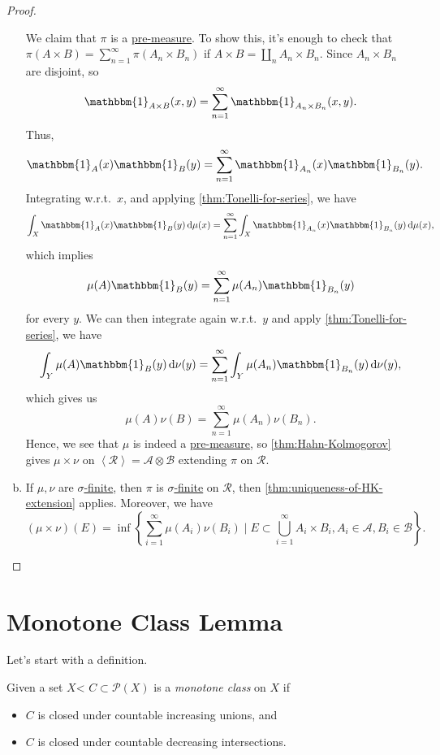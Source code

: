 \begin{proof}
\begin{enumerate}[(a)]
		      We claim that \(\pi \) is a \hyperref[def:pre-measure]{pre-measure}. To show this, it's enough to check that \(\pi (A\times B) = \sum_{n=1}^{\infty} \pi (A_{n} \times B_{n} )\)
		      if \(A\times B = \coprod_{n}A_{n} \times B_{n}  \). Since \(A_{n} \times B_{n} \) are disjoint, so
		      \[
			      \mathbbm{1}_{A\times B}(x, y) = \sum_{n=1}^{\infty} \mathbbm{1}_{A_{n} \times B_{n} }(x, y).
		      \]
		      Thus,
		      \[
			      \mathbbm{1}_{A} (x)\mathbbm{1}_{B} (y) = \sum_{n=1}^{\infty} \mathbbm{1}_{A_{n} }(x)\mathbbm{1}_{B_{n}}(y).
		      \]
		      Integrating w.r.t.\ \(x\), and applying \autoref{thm:Tonelli-for-series}, we have
		      \[
			      \int _X \mathbbm{1}_{A} (x)\mathbbm{1}_{B}(y)\,\mathrm{d} \mu (x) = \sum_{n=1}^{\infty} \int _X \mathbbm{1}_{A_{n} }(x)\mathbbm{1}_{B_{n} }(y)\,\mathrm{d} \mu (x),
		      \]
		      which implies
		      \[
			      \mu (A)\mathbbm{1}_{B} (y) = \sum_{n=1}^{\infty} \mu (A_{n} )\mathbbm{1}_{B_{n} }(y)
		      \]
		      for every \(y\). We can then integrate again w.r.t.\ \(y\) and apply \autoref{thm:Tonelli-for-series}, we have
		      \[
			      \int _Y \mu (A)\mathbbm{1}_{B}(y)\,\mathrm{d} \nu (y) = \sum_{n=1}^{\infty} \int _Y \mu (A_{n} )\mathbbm{1}_{B_{n} }(y)\,\mathrm{d} \nu (y),
		      \]
		      which gives us
		      \[
			      \mu (A)\nu (B) = \sum_{n=1}^{\infty} \mu (A_{n} )\nu (B_{n} ).
		      \]
		      Hence, we see that \(\mu\) is indeed a \hyperref[def:pre-measure]{pre-measure}, so \autoref{thm:Hahn-Kolmogorov} gives \(\mu \times \nu \) on \(\left< \mathcal{R}  \right> = \mathcal{A} \otimes \mathcal{B} \) extending \(\pi \) on \(\mathcal{R} \).
		\item If \(\mu , \nu \) are \hyperref[def:sigma-finite-measure]{\(\sigma\)-finite}, then \(\pi \) is \hyperref[def:sigma-finite-measure]{\(\sigma\)-finite} on \(\mathcal{R} \), then \autoref{thm:uniqueness-of-HK-extension} applies. Moreover, we have
		      \[
			      (\mu \times \nu )(E) = \inf \left\{\sum_{i=1}^{\infty} \mu (A_{i})\nu (B_{i})\mid E\subset \bigcup_{i=1}^{\infty} A_{i} \times B_{i}, A_{i} \in \mathcal{A} , B_{i} \in \mathcal{B} \right\}.
		      \]
	\end{enumerate}
\end{proof}

\section{Monotone Class Lemma}
Let's start with a definition.
\begin{definition}\label{def:monotone-class}
	Given a set \(X\)< \(C\subset \mathcal{P} (X)\) is a \emph{monotone class} on \(X\) if
	\begin{itemize}
		\item \(C\) is closed under countable increasing unions, and
		\item \(C\) is closed under countable decreasing intersections.
	\end{itemize}
\end{definition}

